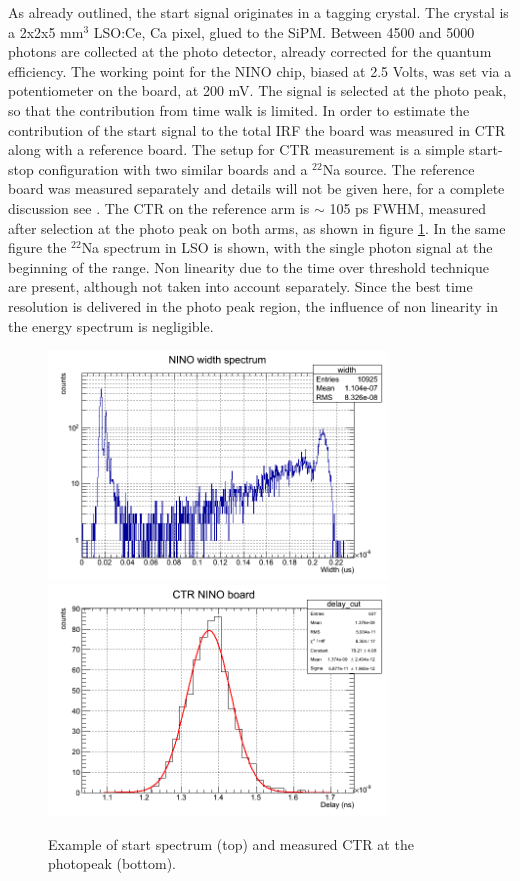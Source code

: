 As already outlined, the start signal originates in a tagging crystal.
The crystal is a 2x2x5 mm$^{3}$ LSO:Ce, Ca pixel, glued to the SiPM. Between 4500 and 5000 photons are collected at the photo detector, already corrected for the quantum efficiency. 
The working point for the NINO chip, biased at 2.5 Volts, was set via a potentiometer on the board, at 200 mV.
The signal is selected at the photo peak, so that the contribution from time walk is limited.
In order to estimate the contribution of the start signal to the total IRF the board was measured in CTR along with a reference board.
The setup for CTR measurement is a simple start-stop configuration with two similar boards and a $^{22}$Na source.
The reference board was measured separately and details will not be given here, for a complete discussion see \cite{Gundacker2014}. The CTR on the reference arm is $\sim$ 105 ps FWHM, measured after selection at the photo peak on both arms, as shown in figure \ref{fig:start}.
In the same figure the $^{22}$Na spectrum in LSO is shown, with the single photon signal at the beginning of the range. Non linearity due to the time over threshold technique are present, although not taken into account separately. Since the best time resolution is delivered in the photo peak region, the influence of non linearity in the energy spectrum is negligible. 
\begin{figure}[htbp]
\begin{center}
\includegraphics[width=9cm]{../Pictures/Chapter_8/spectrum_NINO.png}
\includegraphics[width=9cm]{../Pictures/Chapter_8/CTR.png}
\end{center}
\caption[Start characteristics]{Example of start spectrum (top) and measured CTR at the photopeak (bottom).}
\label{fig:start}
\end{figure}

